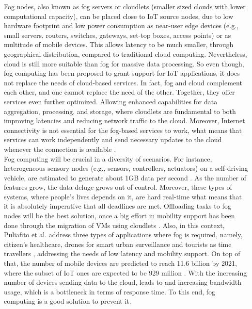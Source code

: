 Fog nodes, also known as fog servers or cloudlets (smaller sized clouds with lower computational capacity), can be placed close to IoT source nodes, due to low hardware footprint and low power consumption as near-user edge devices (e.g., small servers, routers, switches, gateways, set-top boxes, access points) or as multitude of mobile devices. This allows latency to be much smaller, through geographical distribution, compared to traditional cloud computing. Nevertheless, cloud is still more suitable than fog for massive data processing. So even though, fog computing has been proposed to grant support for IoT applications, it does not replace the needs of cloud-based services. In fact, fog and cloud complement each other, and one cannot replace the need of the other.
Together, they offer services even further optimized. Allowing enhanced capabilities for data aggregation, processing, and storage, where cloudlets are fundamental to both improving latencies and reducing network traffic to the cloud. Moreover, Internet connectivity is not essential for the fog-based services to work, what means that services can work independently and send necessary updates to the cloud whenever the connection is available \cite{yousefpour2018all}.\\
\noindent\tab Fog computing will be crucial in a diversity of scenarios. For instance, heterogeneous sensory nodes (e.g., sensors, controllers, actuators) on a self-driving vehicle, are estimated to generate about 1GB data per second \cite{angelica2013google}. As the number of features grow, the data deluge grows out of control. Moreover, these types of systems, where people's lives depends on it, are hard real-time what means that it is absolutely imperative that all deadlines are met. Offloading tasks to fog nodes will be the best solution, once a big effort in mobility support has been done through the migration of VMs using cloudlets \cite{lopes2017myifogsim}. Also, in this context, Puliafito et al. address three types of applications where fog is required, namely, citizen's healthcare, drones for smart urban surveillance and tourists as time travellers \cite{puliafito2017fog}, addressing the needs of low latency and mobility support. On top of that, the number of mobile devices are predicted to reach 11.6 billion by 2021, where the subset of IoT ones are expected to be 929 million \cite{cisco_2017}. With the increasing number of devices sending data to the cloud, leads to and increasing bandwidth usage, which is a bottleneck in terms of response time. To this end, fog computing is a good solution to prevent it.\\
